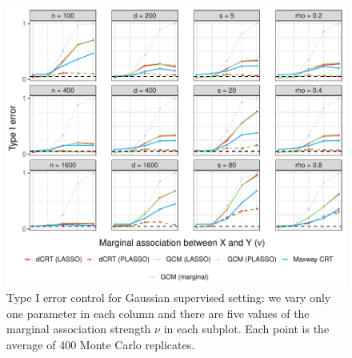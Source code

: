 \documentclass[12pt]{article}
\theoremstyle{definition}
\theoremstyle{remark}
\begin{document}
	\begin{figure}[h]
		\centering
		\includegraphics[scale = 1]{figures/gaussian_supervised_setting_null_partial.pdf}
		\caption{Type I error control for Gaussian supervised setting: we vary only one parameter in each column and there are five values of the marginal association strength $\nu$ in each subplot. Each point is the average of 400 Monte Carlo replicates.}
		\label{fig:gaussian_supervised_partial_null}
	\end{figure}
	
\end{document}
